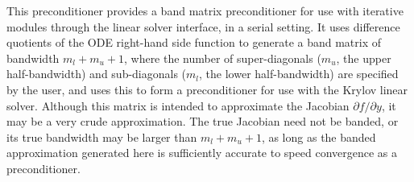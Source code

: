 
This preconditioner provides a band matrix preconditioner for use with
iterative {\sunlinsol} modules through the {\cvls} linear solver
interface, in a serial setting.
It uses difference quotients of the ODE right-hand side function  to
generate a band matrix of bandwidth $m_l + m_u + 1$, where the number of
super-diagonals ($m_u$, the upper half-bandwidth) and sub-diagonals
($m_l$, the lower half-bandwidth) are specified by the user, and uses this to
form a preconditioner for use with the Krylov linear solver.
Although this matrix is intended to approximate the Jacobian
$\partial f / \partial y$, it may be a very crude approximation.  The true Jacobian
need not be banded, or its true bandwidth may be larger than $m_l + m_u + 1$, as
long as the banded approximation generated here is sufficiently accurate to
speed convergence as a preconditioner.

